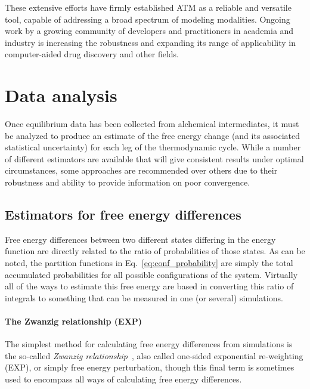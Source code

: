\documentclass[9pt,bestpractices]{livecoms}
\begin{document}
These extensive efforts have firmly established ATM as a reliable and versatile tool, capable of addressing a broad spectrum of modeling modalities.  Ongoing work by a growing community of developers and practitioners in academia and industry is increasing the robustness and expanding its range of applicability in computer-aided drug discovery and other fields.  

\section{Data analysis}
\label{sec:data_analysis}
Once equilibrium data has been collected from alchemical intermediates, it must be analyzed to produce an estimate of the free energy change (and its associated statistical uncertainty) for each leg of the thermodynamic cycle.
While a number of different estimators are available that will give consistent results under optimal circumstances, some approaches are recommended over others due to their robustness and ability to provide information on poor convergence.

\subsection{Estimators for free energy differences}
\label{subsec:estimators}
Free energy differences between two different states differing in the energy function are directly related to the
ratio of probabilities of those states.
As can be noted, the partition functions in Eq.~\ref{eq:conf_probability} are simply the total accumulated probabilities for all possible configurations of the system. Virtually all of the ways to estimate this free energy are based in converting this ratio of integrals to something that can be measured in one (or several) simulations.  

\paragraph{The Zwanzig relationship (EXP)}
The simplest method for calculating free energy differences from simulations is the so-called \textit{Zwanzig
relationship}~\cite{zwanzig1954hightemperature}, also called one-sided exponential re-weighting (EXP), or simply free energy perturbation, though this final term is sometimes used to encompass all ways of calculating free energy differences.
\end{document}
